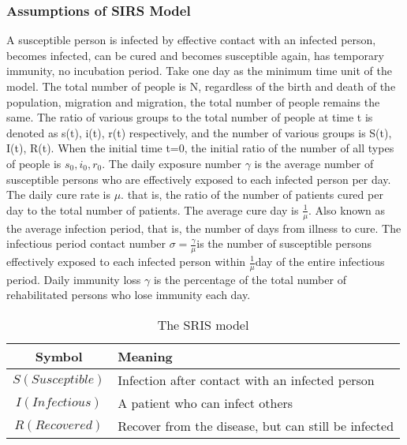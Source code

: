 \documentclass[12pt]{article}  %
\begin{document}
\subsubsection{Assumptions of SIRS Model}
A susceptible person is infected by effective contact with an infected person, becomes infected, can be cured and becomes susceptible again, has temporary immunity, no incubation period. Take one day as the minimum time unit of the model. The total number of people is N, regardless of the birth and death of the population, migration and migration, the total number of people remains the same. The ratio of various groups to the total number of people at time t is denoted as s(t), i(t), r(t) respectively, and the number of various groups is S(t), I(t), R(t). When the initial time t=0, the initial ratio of the number of all types of people is $s_0, i_0, r_0$. The daily exposure number $\gamma$ is the average number of susceptible persons who are effectively exposed to each infected person per day. The daily cure rate is $\mu$. that is, the ratio of the number of patients cured per day to the total number of patients. The average cure day is $\frac{1}{\mu}$. Also known as the average infection period, that is, the number of days from illness to cure. The infectious period contact number $\sigma=\frac{\gamma}{\mu}$is the number of susceptible persons effectively exposed to each infected person within $\frac{1}{\mu}$day of the entire infectious period. Daily immunity loss $\gamma$ is the percentage of the total number of rehabilitated persons who lose immunity each day.


\begin{table}[!htbp]
	\begin{center}
		\caption{The  SRIS model}
		\begin{tabular}{cl}
			\toprule
			\multicolumn{1}{m{3cm}}{\centering Symbol}
			&\multicolumn{1}{m{8cm}}{\centering Meaning}\\
			\midrule
			$S (Susceptible)$&   \qquad\qquad\qquad Infection after contact with an infected person\\
			$I (Infectious)$&   \qquad\qquad\qquad A patient who can infect others\\
			$R (Recovered)$ &  \qquad\qquad\qquad  Recover from the disease, but can still be infected\\
			\bottomrule
		\end{tabular}\label{tb:notation}
	\end{center}
\end{table}
\end{document}
